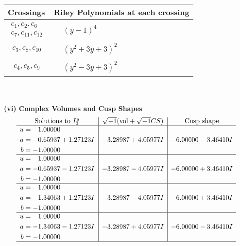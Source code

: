 \documentclass[1p]{elsarticle_modified}
\theoremstyle{definition}
\newcommand{\I}{\sqrt{-1}}
\begin{document}
\begin{tabular}{m{50pt}|m{274pt}}
Crossings & \hspace{64pt}Riley Polynomials at each crossing \\
\hline $$\begin{aligned}c_{1},c_{2},c_{6}\\c_{7},c_{11},c_{12}\end{aligned}$$&$\begin{aligned}
&(y-1)^4
\end{aligned}$\\
\hline $$\begin{aligned}c_{3},c_{8},c_{10}\end{aligned}$$&$\begin{aligned}
&(y^2+3 y+3)^2
\end{aligned}$\\
\hline $$\begin{aligned}c_{4},c_{5},c_{9}\end{aligned}$$&$\begin{aligned}
&(y^2-3 y+3)^2
\end{aligned}$\\
\hline
\end{tabular}\\~\\
\newpage\flushleft \textbf{(vi) Complex Volumes and Cusp Shapes}
$$\begin{array}{c|c|c}  
\text{Solutions to }I^u_{3}& \I (\text{vol} + \sqrt{-1}CS) & \text{Cusp shape}\\
 \hline 
\begin{aligned}
u &= \phantom{-}1.00000\phantom{ +0.000000I} \\
a &= -0.65937 + 1.27123 I \\
b &= -1.00000\phantom{ +0.000000I}\end{aligned}
 & -3.28987 + 4.05977 I & -6.00000 - 3.46410 I \\ \hline\begin{aligned}
u &= \phantom{-}1.00000\phantom{ +0.000000I} \\
a &= -0.65937 - 1.27123 I \\
b &= -1.00000\phantom{ +0.000000I}\end{aligned}
 & -3.28987 - 4.05977 I & -6.00000 + 3.46410 I \\ \hline\begin{aligned}
u &= \phantom{-}1.00000\phantom{ +0.000000I} \\
a &= -1.34063 + 1.27123 I \\
b &= -1.00000\phantom{ +0.000000I}\end{aligned}
 & -3.28987 - 4.05977 I & -6.00000 + 3.46410 I \\ \hline\begin{aligned}
u &= \phantom{-}1.00000\phantom{ +0.000000I} \\
a &= -1.34063 - 1.27123 I \\
b &= -1.00000\phantom{ +0.000000I}\end{aligned}
 & -3.28987 + 4.05977 I & -6.00000 - 3.46410 I\\
 \hline 
 \end{array}$$\newpage\newpage\renewcommand{\arraystretch}{1}
\end{document}
